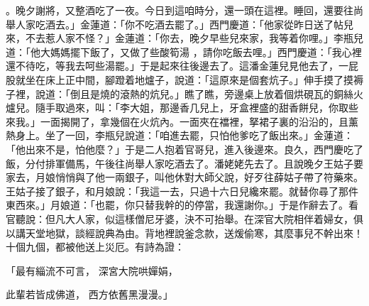 。晚夕謝將，又整酒吃了一夜。今日到這咱時分，還一頭在這裡。睡回，還要往尚舉人家吃酒去。」金蓮道：「你不吃酒去罷了。」西門慶道：「他家從昨日送了帖兒來，不去惹人家不怪？」金蓮道：「你去，晚夕早些兒來家，我等着你哩。」李瓶兒道：「他大媽媽擺下飯了，又做了些酸筍湯 ，請你吃飯去哩。」西門慶道：「我心裡還不待吃，等我去呵些湯罷。」于是起來往後邊去了。這潘金蓮兒見他去了，一屁股就坐在床上正中間，腳蹬着地爐子，說道：「這原來是個套炕子。」伸手摸了摸褥子裡，說道：「倒且是燒的滾熱的炕兒。」瞧了瞧，旁邊桌上放着個烘硯瓦的銅絲火爐兒。隨手取過來，叫：「李大姐，那邊香几兒上，牙盒裡盛的甜香餅兒，你取些來我。」一面揭開了，拿幾個在火炕內。一面夾在襠裡，拏裙子裏的沿沿的，且薰熱身上。坐了一回，李瓶兒說道：「咱進去罷，只怕他爹吃了飯出來。」金蓮道：「他出來不是，怕他麼？」于是二人抱着官哥兒，進入後邊來。良久，西門慶吃了飯，分付排軍備馬，午後往尚舉人家吃酒去了。潘姥姥先去了。且說晚夕王姑子要家去，月娘悄悄與了他一兩銀子，叫他休對大師父說，好歹往薛姑子帶了符藥來。王姑子接了銀子，和月娘說：「我這一去，只過十六日兒纔來罷。就替你尋了那件東西來。」月娘道：「也罷，你只替我幹的的停當，我還謝你。」于是作辭去了。看官聽說：但凡大人家，似這樣僧尼牙婆，決不可抬舉。在深官大院相伴着婦女，俱以講天堂地獄，談經說典為由。背地裡說釜念款，送煖偷寒，其麼事兒不幹出來！十個九個，都被他送上災厄。有詩為證：

「最有緇流不可言，  深宮大院哄嬋娟，

此輩若皆成佛道，  西方依舊黑漫漫。」

